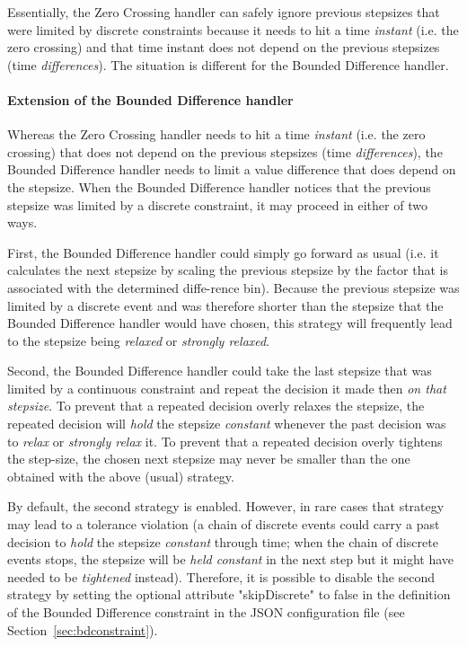 \noindent Essentially, the Zero Crossing handler can safely ignore previous stepsizes that were limited by discrete constraints because it needs to hit a time \textit{instant} (i.e. the zero crossing) and that time instant does not depend on the previous stepsizes (time \textit{differences}). The situation is different for the Bounded Difference handler.

\paragraph{Extension of the Bounded Difference handler}

Whereas the Zero Crossing handler needs to hit a time \textit{instant} (i.e. the zero crossing) that does not depend on the previous stepsizes (time \textit{differences}), the Bounded Difference handler needs to limit a value difference that does depend on the stepsize. When the Bounded Difference handler notices that the previous stepsize was limited by a discrete constraint, it may proceed in either of two ways.

\noindent First, the Bounded Difference handler could simply go forward as usual (i.e. it calculates the next stepsize by scaling the previous stepsize by the factor that is associated with the determined diffe-rence bin). Because the previous stepsize was limited by a discrete event and was therefore shorter than the stepsize that the Bounded Difference handler would have chosen, this strategy will frequently lead to the stepsize being \textit{relaxed} or \textit{strongly relaxed}.

\noindent Second, the Bounded Difference handler could take the last stepsize that was limited by a continuous constraint and repeat the decision it made then \emph{on that stepsize}. To prevent that a repeated decision overly relaxes the stepsize, the repeated decision will \textit{hold} the stepsize \textit{constant} whenever the past decision was to \textit{relax} or \textit{strongly relax} it. To prevent that a repeated decision overly tightens the step-size, the chosen next stepsize may never be smaller than the one obtained with the above (usual) strategy.

\noindent By default, the second strategy is enabled. However, in rare cases that strategy may lead to a tolerance violation (a chain of discrete events could carry a past decision to \textit{hold} the stepsize \textit{constant} through time; when the chain of discrete events stops, the stepsize will be \textit{held constant} in the next step but it might have needed to be \textit{tightened} instead). Therefore, it is possible to disable the second strategy by setting the optional attribute {\ttfamily "skipDiscrete"} to {\ttfamily false} in the definition of the Bounded Difference constraint in the JSON configuration file (see Section~\ref{sec:bdconstraint}).

